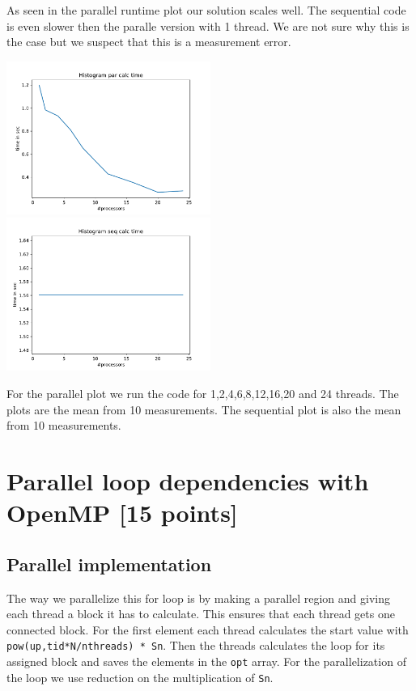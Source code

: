 \documentclass[unicode,11pt,a4paper,oneside,numbers=endperiod,openany]{scrartcl}
\begin{document}
As seen in the parallel runtime plot our solution scales well. The sequential code is even slower then the paralle version with 1 thread.
We are not sure why this is the case but we suspect that this is a measurement error.

\includegraphics[width=0.5\textwidth]{../results/par_hist.pdf}
\includegraphics[width=0.5\textwidth]{../results/seq_hist.pdf}

For the parallel plot we run the code for 1,2,4,6,8,12,16,20 and 24 threads. The plots are the mean from 10 measurements.
The sequential plot is also the mean from 10 measurements.


\section{Parallel loop dependencies with OpenMP [15 points]}

\subsection{Parallel implementation}
The way we parallelize this for loop is by making a parallel region and giving each thread a block it has to calculate.
This ensures that each thread gets one connected block.
For the first element each thread calculates the start value with \texttt{pow(up,tid*N/nthreads) * Sn}.
Then the threads calculates the loop for its assigned block and saves the elements in the \texttt{opt} array.
For the parallelization of the loop we use reduction on the multiplication of \texttt{Sn}.
\end{document}
